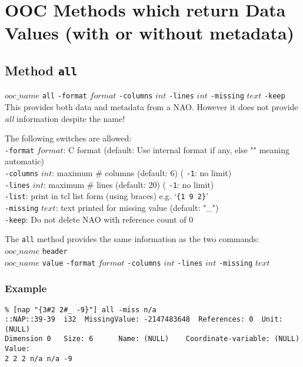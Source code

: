     \section{OOC Methods which return Data Values (with or without
    metadata)}

  \subsection{
    \label{all}Method \texttt{all}
  }

  


  $ooc\_name$ 
  \texttt{all} 
  \texttt{-format} 
  $format$ 
  \texttt{-columns} 
  $int$ 
  \texttt{-lines} 
  $int$ 
  \texttt{-missing} 
  $text$ 
  \texttt{-keep}
  \\
  

This provides both data and metadata from a NAO. However it does
  not provide 
  \emph{all} information despite the name!
  

The following switches are allowed:
  \\
  \texttt{-format} 
  $format$: C format (default: Use internal format if any,
  else "" meaning automatic)
  \\
  \texttt{-columns} 
  $int$: maximum \# columns (default: 6) (
  \texttt{-1}: no limit)
  \\
  \texttt{-lines} 
  $int$: maximum \# lines (default: 20) (
  \texttt{-1}: no limit)
  \\
  \texttt{-list}: print in tcl list form (using braces) e.g. `\texttt{\{1 9 2\}}'
  \\
  \texttt{-missing} 
  $text$: text printed for missing value (default:
  "\_")
  \\
  \texttt{-keep}: Do not delete NAO with reference count of 0
  

The 
  \texttt{all} method provides the same information as the two
  commands:
  \\
  $ooc\_name$ 
  \texttt{header}
  \\
  $ooc\_name$ 
  \texttt{value} 
  \texttt{-format} 
  $format$ 
  \texttt{-columns} 
  $int$ 
  \texttt{-lines} 
  $int$ 
  \texttt{-missing} 
  $text$
  \\
  \subsubsection{Example}

  \begin{verbatim}
% [nap "{3#2 2#_ -9}"] all -miss n/a
::NAP::39-39  i32  MissingValue: -2147483648  References: 0  Unit:
(NULL)
Dimension 0   Size: 6      Name: (NULL)    Coordinate-variable: (NULL)
Value:
2 2 2 n/a n/a -9
\end{verbatim}

